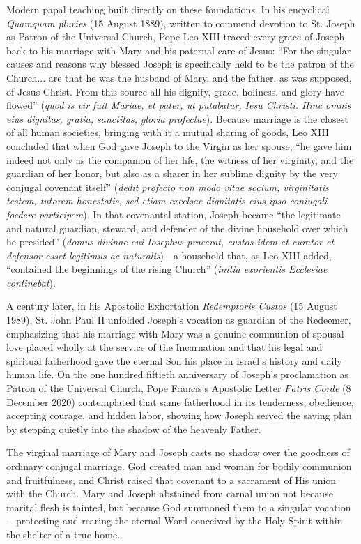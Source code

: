Modern papal teaching built directly on these foundations. In his encyclical \textit{Quamquam pluries} (15 August 1889), written to commend devotion to St. Joseph as Patron of the Universal Church, Pope Leo XIII traced every grace of Joseph back to his marriage with Mary and his paternal care of Jesus: ``For the singular causes and reasons why blessed Joseph is specifically held to be the patron of the Church... are that he was the husband of Mary, and the father, as was supposed, of Jesus Christ. From this source all his dignity, grace, holiness, and glory have flowed'' (\textit{quod is vir fuit Mariae, et pater, ut putabatur, Iesu Christi. Hinc omnis eius dignitas, gratia, sanctitas, gloria profectae}). Because marriage is the closest of all human societies, bringing with it a mutual sharing of goods, Leo XIII concluded that when God gave Joseph to the Virgin as her spouse, ``he gave him indeed not only as the companion of her life, the witness of her virginity, and the guardian of her honor, but also as a sharer in her sublime dignity by the very conjugal covenant itself'' (\textit{dedit profecto non modo vitae socium, virginitatis testem, tutorem honestatis, sed etiam excelsae dignitatis eius ipso coniugali foedere participem}). In that covenantal station, Joseph became ``the legitimate and natural guardian, steward, and defender of the divine household over which he presided'' (\textit{domus divinae cui Iosephus praeerat, custos idem et curator et defensor esset legitimus ac naturalis})---a household that, as Leo XIII added, ``contained the beginnings of the rising Church'' (\textit{initia exorientis Ecclesiae continebat}).

A century later, in his Apostolic Exhortation \textit{Redemptoris Custos} (15 August 1989), St. John Paul II unfolded Joseph's vocation as guardian of the Redeemer, emphasizing that his marriage with Mary was a genuine communion of spousal love placed wholly at the service of the Incarnation and that his legal and spiritual fatherhood gave the eternal Son his place in Israel's history and daily human life. On the one hundred fiftieth anniversary of Joseph's proclamation as Patron of the Universal Church, Pope Francis's Apostolic Letter \textit{Patris Corde} (8 December 2020) contemplated that same fatherhood in its tenderness, obedience, accepting courage, and hidden labor, showing how Joseph served the saving plan by stepping quietly into the shadow of the heavenly Father.

The virginal marriage of Mary and Joseph casts no shadow over the goodness of ordinary conjugal marriage. God created man and woman for bodily communion and fruitfulness, and Christ raised that covenant to a sacrament of His union with the Church. Mary and Joseph abstained from carnal union not because marital flesh is tainted, but because God summoned them to a singular vocation---protecting and rearing the eternal Word conceived by the Holy Spirit within the shelter of a true home.

